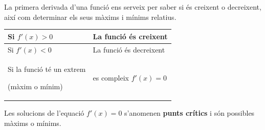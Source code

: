 		\begin{theorybox}
			La primera derivada d'una funció ens serveix per saber si és creixent o decreixent, així com determinar els seus màxims i mínims relatius.
			
			\begin{center}
			\begin{tabular}{p{6cm}| p{8cm}}
				Si $f'(x)>0$ & La funció és creixent \\ [0.15cm] \hline
				Si $f'(x)<0$ & La funció és decreixent \\ [0.15cm] \hline 
				Si la funció té un extrem \par (màxim o mínim) & es compleix $f'(x)=0$
			\end{tabular}
			\end{center}
			Les solucions de l'equació $f'(x)=0$ s'anomenen \textbf{punts crítics} i són possibles màxims o mínims.
		\end{theorybox}
		
